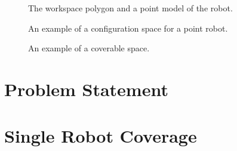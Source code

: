 \documentclass[letterpaper,12pt,titlepage,oneside,final]{book}
\begin{document}
 




\begin{figure}
	\centering
	
	\caption{The workspace polygon and a point model of the robot.}
	\label{fig:workspace_and_system}
\end{figure}

\begin{figure}
	\centering
	
	\caption{An example of a configuration space for a point robot.}
	\label{fig:configuration_space}
\end{figure}

\begin{figure}
	\centering
	
	\caption{An example of a coverable space.}
	\label{fig:coverable_space}
\end{figure}


\section{Problem Statement}
\label{sec:problem_statement}




\section{Single Robot Coverage}
\label{sec:single_robot_coverage}

%
\end{document}
